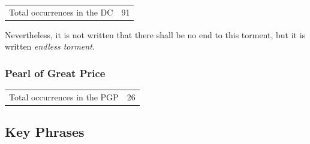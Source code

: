 		\begin{tabular}{ll}
			Total occurrences in the DC & 91
		\end{tabular}
		
		\begin{compactdesc}
			\item[DC 19:6] Nevertheless, it is not written that there shall be no end to this torment, but it is written \textit{endless torment}.
		\end{compactdesc}
		
	\subsubsection{Pearl of Great Price} %
		\label{END-PGP}
	
		\begin{tabular}{ll}
			Total occurrences in the PGP & 26
		\end{tabular}
		
		\begin{compactdesc}
			\item[]
		\end{compactdesc}
		
\subsection{Key Phrases} %
	\label{END-PHRASES}

